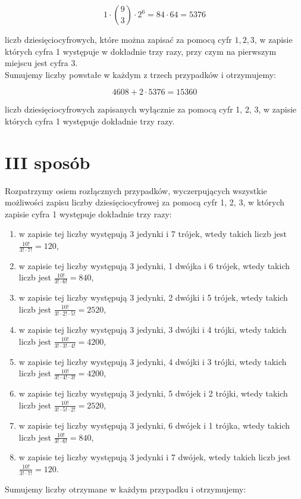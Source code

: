 \documentclass[10pt]{article}
\begin{document}
$$
1 \cdot\binom{9}{3} \cdot 2^{6}=84 \cdot 64=5376
$$

liczb dziesięciocyfrowych, które można zapisać za pomocą cyfr $1,2,3$, w zapisie których cyfra 1 występuje w dokładnie trzy razy, przy czym na pierwszym miejscu jest cyfra 3.\\
Sumujemy liczby powstałe w każdym z trzech przypadków i otrzymujemy:

$$
4608+2 \cdot 5376=15360
$$

liczb dziesięciocyfrowych zapisanych wyłącznie za pomocą cyfr 1, 2, 3, w zapisie których cyfra 1 występuje dokładnie trzy razy.

\section*{III sposób}
Rozpatrzymy osiem rozłącznych przypadków, wyczerpujących wszystkie możliwości zapisu liczby dziesięciocyfrowej za pomocą cyfr 1, 2, 3, w których zapisie cyfra 1 występuje dokładnie trzy razy:

\begin{enumerate}
  \item w zapisie tej liczby występują 3 jedynki i 7 trójek, wtedy takich liczb jest $\frac{10!}{3!\cdot 7!}=120$,
  \item w zapisie tej liczby występują 3 jedynki, 1 dwójka i 6 trójek, wtedy takich liczb jest $\frac{10!}{3!\cdot 6!}=840$,
  \item w zapisie tej liczby występują 3 jedynki, 2 dwójki i 5 trójek, wtedy takich liczb jest $\frac{10!}{3!\cdot 2!\cdot 5!}=2520$,
  \item w zapisie tej liczby występują 3 jedynki, 3 dwójki i 4 trójki, wtedy takich liczb jest $\frac{10!}{3!\cdot 3!\cdot 4!}=4200$,
  \item w zapisie tej liczby występują 3 jedynki, 4 dwójki i 3 trójki, wtedy takich liczb jest $\frac{10!}{3!\cdot 4!\cdot 3!}=4200$,
  \item w zapisie tej liczby występują 3 jedynki, 5 dwójek i 2 trójki, wtedy takich liczb jest $\frac{10!}{3!\cdot 5!\cdot 2!}=2520$,
  \item w zapisie tej liczby występują 3 jedynki, 6 dwójek i 1 trójka, wtedy takich liczb jest $\frac{10!}{3!\cdot 6!}=840$,
  \item w zapisie tej liczby występują 3 jedynki i 7 dwójek, wtedy takich liczb jest $\frac{10!}{3!\cdot 7!}=120$.
\end{enumerate}

Sumujemy liczby otrzymane w każdym przypadku i otrzymujemy:
\end{document}
